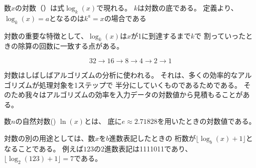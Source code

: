 数$x$の対数（）は式$\log_k(x)$で現れる。
$k$は対数の底である。
定義より、$\log_k(x)=a$となるのは$k^a=x$の場合である

対数の重要な特徴として、$\log_k(x)$は$x$が1に到達するまで$k$で
割っていったときの除算の回数に一致する点がある。

\[32 \rightarrow 16 \rightarrow 8 \rightarrow 4 \rightarrow 2 \rightarrow 1 \]

\begin{comment}
Logarithms are often used in the analysis of
algorithms, because many efficient algorithms
halve something at each step.
Hence, we can estimate the efficiency of such algorithms
using logarithms.

The logarithm of a product is
\[\log_k(ab) = \log_k(a)+\log_k(b),\]
and consequently,
\[\log_k(x^n) = n \cdot \log_k(x).\]
In addition, the logarithm of a quotient is
\[\log_k\Big(\frac{a}{b}\Big) = \log_k(a)-\log_k(b).\]
Another useful formula is
\[\log_u(x) = \frac{\log_k(x)}{\log_k(u)},\]
and using this, it is possible to calculate
logarithms to any base if there is a way to
calculate logarithms to some fixed base.
\end{comment}

対数はしばしばアルゴリズムの分析に使われる。
それは、多くの効率的なアルゴリズムが処理対象を1ステップで
半分にしていくものであるためである。
そのため我々はアルゴリズムの効率を入力データの対数値から見積もることがある。


\begin{comment}
The \key{natural logarithm} $\ln(x)$ of a number $x$
is a logarithm whose base is $e \approx 2.71828$.
Another property of logarithms is that
the number of digits of an integer $x$ in base $b$ is
$\lfloor \log_b(x)+1 \rfloor$.
For example, the representation of
$123$ in base $2$ is 1111011 and
$\lfloor \log_2(123)+1 \rfloor = 7$.
\end{comment}

数$n$の自然対数() $\ln(x)$とは、
底に$e \approx 2.71828$を用いたときの対数値である。

対数の別の用途としては、数$x$を$b$進数表記したときの
桁数が$\lfloor \log_b(x)+1 \rfloor$となることである。
例えば$123$の2進数表記は1111011であり、$\lfloor \log_2(123)+1 \rfloor = 7$である。

\begin{comment}
\section{Contests and resources}
\end{comment}

